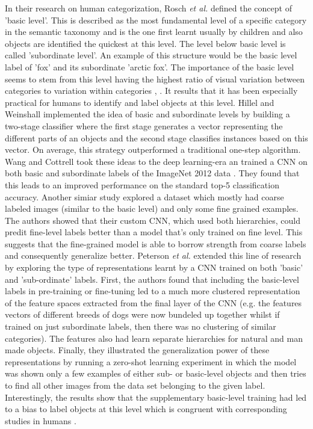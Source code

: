 \documentclass[12pt]{report}
\begin{document}
In their research on human categorization, Rosch \textit{et al.} \cite{Rosch1976} defined the concept of 'basic level'. This is described as the most fundamental level of a specific category in the semantic taxonomy and is the one first learnt usually by children and also objects are identified the quickest at this level. The level below basic level is called 'subordinate level'. An example of this structure would be the basic level label of 'fox' and its subordinate 'arctic fox'. The importance of the basic level seems to stem from this level having the highest ratio of visual variation between categories to variation within categories \cite{Rosch1976}, \cite{Joliceur1984}. It results that it has been especially practical for humans to identify and label objects at this level. Hillel and Weinshall \cite{Hillel2007} implemented the idea of basic and subordinate levels by building a two-stage classifier where the first stage generates a vector representing the different parts of an objects and the second stage classifies instances based on this vector. On average, this strategy outperformed a traditional one-step algorithm. Wang and Cottrell \cite{Wang2015} took these ideas to the deep learning-era an trained a CNN on both basic and subordinate labels of the ImageNet 2012 data \cite{Russakovsky2015}. They found that this leads to an improved performance on the standard top-5 classification accuracy. Another simiar study \cite{Lei2018} explored a dataset which mostly had coarse labeled images (similar to the basic level) and only some fine grained examples. The authors showed that their custom CNN, which used both hierarchies, could predit fine-level labels better than a model that's only trained on fine level. This suggests that the fine-grained model is able to borrow strength from coarse labels and consequently generalize better. Peterson \textit{et al.} \cite{Peterson2018} extended this line of research by exploring the type of representations learnt by a CNN trained on both 'basic' and 'sub-ordinate' labels. First, the authors found that including the basic-level labels in pre-training or fine-tuning led to a much more clustered representation of the feature spaces extracted from the final layer of the CNN (e.g. the features vectors of different breeds of dogs were now bundeled up together whilst if trained on just subordinate labels, then there was no clustering of similar categories). The features also had learn separate hierarchies for natural and man made objects. Finally, they illustrated the generalization power of these representations by running a zero-shot learning experiment in which the model was shown only a few examples of either sub- or basic-level objects and then tries to find all other images from the data set belonging to the given label. Interestingly, the results show that the supplementary basic-level training had led to a bias to label objects at this level which is congruent with corresponding studies in humans \cite{Xu2000}.
\end{document}
